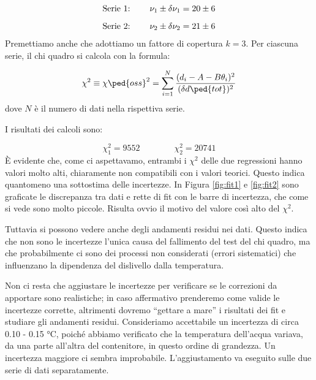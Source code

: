\begin{equation}
    \begin{array}{l @{\hspace{0.8cm}} c}
        \text{Serie 1:} & \nu_1 \pm \delta \nu_1 = 20 \pm 6 \\[3mm]
        \text{Serie 2:} & \nu_2 \pm \delta \nu_2 = 21 \pm 6
    \end{array}
\end{equation}
%
Premettiamo anche che adottiamo un fattore di copertura $k = 3$.
Per ciascuna serie, il chi quadro si calcola con la formula:

\begin{equation}
    \chi^2 \equiv \chi\ped{oss}^2 = \sum_{i=1}^{N} \frac{(d_i - A - B\theta_i)^2}{(\delta d\ped{tot})^2}
    \label{eq:chi2}
\end{equation}
%
dove $N$ è il numero di dati nella rispettiva serie. 

I risultati dei calcoli sono:

\begin{equation}
    \chi_1^2 = 9552 \qquad \qquad \chi_2^2 = 20741
\end{equation}
%
\`E evidente che, come ci aspettavamo, entrambi i $\chi^2$ delle due regressioni hanno valori molto alti, chiaramente non compatibili con
i valori teorici. Questo indica quantomeno una sottostima delle incertezze. In Figura \ref{fig:fit1} e \ref{fig:fit2} sono
graficate le discrepanza tra dati e rette di fit con le barre di incertezza, che come si vede sono molto piccole. Risulta ovvio il motivo del
valore così alto del $\chi^2$.

Tuttavia si possono vedere anche degli andamenti residui nei dati. Questo indica che non sono le incertezze l'unica
causa del fallimento del test del chi quadro, ma che probabilmente ci sono dei processi non considerati (errori sistematici)
che influenzano la dipendenza del dislivello dalla temperatura.

Non ci resta che aggiustare le incertezze per verificare se le correzioni da apportare sono realistiche; in caso affermativo
prenderemo come valide le incertezze corrette, altrimenti dovremo ``gettare a mare'' i risultati dei fit e studiare gli
andamenti residui.
Consideriamo accettabile un incertezza di circa 0.10 - 0.15 \si{\celsius}, poiché abbiamo verificato che la temperatura dell'acqua
variava, da una parte all'altra del contenitore, in questo ordine di grandezza. Un incertezza maggiore ci sembra improbabile.
L'aggiustamento va eseguito sulle due serie di dati separatamente.

